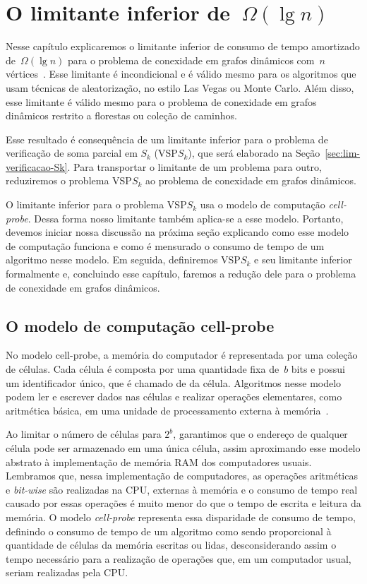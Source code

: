 \chapter{O limitante inferior de~$\Omega(\lg n)$}
\label{sec:lim}
Nesse capítulo explicaremos o limitante inferior de consumo de tempo amortizado de~$\Omega(\lg n)$ para o problema de conexidade em grafos dinâmicos com~$n$ vértices~\cite{lowerBoundPatrascu}. Esse limitante é incondicional e é válido mesmo para os algoritmos que usam técnicas de aleatorização, no estilo Las Vegas ou Monte Carlo. Além disso, esse limitante é válido mesmo para o problema de conexidade em grafos dinâmicos restrito a florestas ou coleção de caminhos. 

Esse resultado é consequência de um limitante inferior para o problema de verificação de soma parcial em $S_k$ (VSP$S_k$), 
que será elaborado na Seção~\ref{sec:lim-verificacao-Sk}.
Para transportar o limitante de um problema para outro, reduziremos o problema VSP$S_k$ ao problema de conexidade em grafos dinâmicos.

O limitante inferior para o problema VSP$S_k$ usa o modelo de computação \textit{cell-probe}. Dessa forma nosso limitante também aplica-se a esse modelo. Portanto, devemos iniciar nossa discussão na próxima seção explicando como esse modelo de computação funciona e como é mensurado o consumo de tempo de um algoritmo nesse modelo. Em seguida, definiremos VSP$S_k$ e seu limitante inferior formalmente e, concluindo esse capítulo, faremos a redução dele para o problema de conexidade em grafos dinâmicos.

\section{O modelo de computação cell-probe}
\label{sec:lim-cell-probe}
No modelo cell-probe, a memória do computador é representada por uma coleção de células. Cada célula é composta por uma quantidade fixa de~$b$ bits e possui um identificador único, que é chamado de  da célula. Algoritmos nesse modelo podem ler e escrever dados nas células e realizar operações elementares, como aritmética básica, em uma unidade de processamento externa à memória~\cite{Ajtai1988}.

Ao limitar o número de células para $2^b$, garantimos que o endereço de qualquer célula pode ser armazenado em uma única célula, assim aproximando esse modelo abstrato à implementação de memória RAM dos computadores usuais. Lembramos que, nessa implementação de computadores, as operações aritméticas e \textit{bit-wise} são realizadas na CPU, externas à memória e o consumo de tempo real causado por essas operações é muito menor do que o tempo de escrita e leitura da memória. O modelo \textit{cell-probe} representa essa disparidade de consumo de tempo, definindo o consumo de tempo de um algoritmo como sendo proporcional à quantidade de células da memória escritas ou lidas, desconsiderando assim o tempo necessário para a realização de operações que, em um computador usual, seriam realizadas pela CPU.

